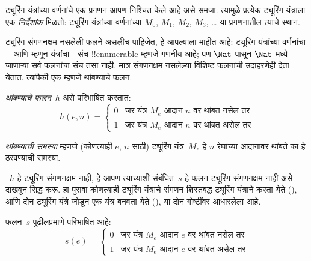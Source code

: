 \documentclass[../../../include/open-logic-section]{subfiles}
\begin{document}

\begin{explain}
ट्यूरिंग यंत्रांच्या वर्णनांचे एक प्रगणन आपण निश्चित
केले आहे असे समजा. त्यामुळे प्रत्येक ट्यूरिंग
यंत्राला एक \emph{निर्देशांक} मिळतो: ट्यूरिंग
यंत्रांच्या वर्णनांच्या $M_0$, $M_1$, $M_2$, $M_3$,
\dots{} या प्रगणनातील त्याचे स्थान.

ट्यूरिंग-संगणनक्षम नसलेली फलने असलीच पाहिजेत,
हे आपल्याला माहीत आहे: ट्यूरिंग यंत्रांच्या
वर्णनांचा---आणि म्हणून यंत्रांचा---संच
!!{enumerable} म्हणजे गणनीय आहे; पण
$\Nat$ पासून $\Nat$ मध्ये जाणाऱ्या सर्व
फलनांचा संच तसा नाही. मात्र संगणनक्षम
नसलेल्या विशिष्ट फलनांची उदाहरणेही देता
येतात. त्यांपैकी एक म्हणजे थांबण्याचे फलन.
\end{explain}

\begin{defn}[थांबण्याचे फलन]
 \emph{थांबण्याचे फलन}~$h$ असे परिभाषित करतात:
\[
h(e,n) =
\begin{cases}
  \text{0} & \text{जर यंत्र~$M_e$ आदान $n$ वर थांबत नसेल तर} \\
  \text{1} & \text{जर यंत्र~$M_e$ आदान $n$ वर थांबत असेल तर}
\end{cases}
\]
\end{defn}

\begin{defn}[थांबण्याची समस्या]
\emph{थांबण्याची समस्या} म्हणजे (कोणत्याही $e$, $n$
साठी) ट्यूरिंग यंत्र~$M_e$ हे $n$ रेघांच्या
आदानावर थांबते का हे ठरवण्याची समस्या.
\end{defn}

\begin{explain}
~$h$ हे ट्यूरिंग-संगणनक्षम नाही, हे आपण
त्याच्याशी संबंधित~$s$ हे फलन ट्यूरिंग-संगणनक्षम
नाही असे दाखवून सिद्ध करू. हा पुरावा कोणत्याही
ट्यूरिंग यंत्राचे संगणन शिस्तबद्ध ट्यूरिंग
यंत्राने करता येते (),
आणि दोन ट्यूरिंग यंत्रे जोडून एक यंत्र
बनवता येते (),
या दोन गोष्टींवर आधारलेला आहे.
\end{explain}

\begin{defn} फलन~$s$ पुढीलप्रमाणे परिभाषित आहे:
\[
s(e) =
\begin{cases}
  \text{0} & \text{जर यंत्र~$M_e$ आदान $e$ वर थांबत नसेल तर} \\
  \text{1} & \text{जर यंत्र~$M_e$ आदान $e$ वर थांबत असेल तर}
\end{cases}
\]
\end{defn}
\end{document}
